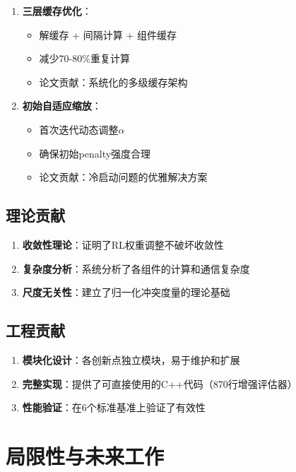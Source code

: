 \documentclass[15pt,a3paper]{ctexart}
\begin{document}
\begin{enumerate}
    \item \textbf{三层缓存优化}：
    \begin{itemize}
        \item 解缓存 + 间隔计算 + 组件缓存
        \item 减少70-80\%重复计算
        \item 论文贡献：系统化的多级缓存架构
    \end{itemize}
    
    \item \textbf{初始自适应缩放}：
    \begin{itemize}
        \item 首次迭代动态调整$\alpha$
        \item 确保初始penalty强度合理
        \item 论文贡献：冷启动问题的优雅解决方案
    \end{itemize}
\end{enumerate}

\subsection{理论贡献}

\begin{enumerate}
    \item \textbf{收敛性理论}：证明了RL权重调整不破坏收敛性
    \item \textbf{复杂度分析}：系统分析了各组件的计算和通信复杂度
    \item \textbf{尺度无关性}：建立了归一化冲突度量的理论基础
\end{enumerate}

\subsection{工程贡献}

\begin{enumerate}
    \item \textbf{模块化设计}：各创新点独立模块，易于维护和扩展
    \item \textbf{完整实现}：提供了可直接使用的C++代码（870行增强评估器）
    \item \textbf{性能验证}：在6个标准基准上验证了有效性
\end{enumerate}

\section{局限性与未来工作}
\end{document}
